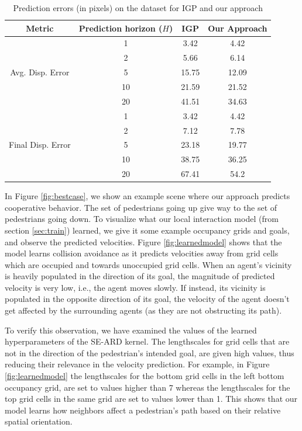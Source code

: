 \begin{table}[t!]
  \caption{Prediction errors (in pixels) on the dataset for IGP and our approach}
  \centering
  \begin{tabular}{|c|c|c|c|}
    \hline
    Metric & Prediction horizon ($H$) & IGP & Our Approach \\
    \hline
    \multirow{5}{*}{Avg. Disp. Error} & 1 & 3.42 & 4.42 \\
    & 2 & 5.66 & 6.14 \\
    & 5 & 15.75 & 12.09 \\
    & 10 & 21.59 & 21.52 \\
    & 20 & 41.51 & 34.63 \\
    \hline
    \multirow{5}{*}{Final Disp. Error} & 1 & 3.42 & 4.42 \\
    & 2 & 7.12 & 7.78 \\
    & 5 & 23.18 & 19.77 \\
    & 10 & 38.75 & 36.25 \\
    & 20 & 67.41 & 54.2 \\
    \hline
  \end{tabular}
  \label{table:results}
\end{table}

In Figure \ref{fig:bestcase}, we show an example scene where our approach predicts cooperative behavior. The set of pedestrians going up give way to the set of pedestrians going down. To visualize what our local interaction model (from section \ref{sec:train}) learned, we give it some example occupancy grids and goals, and observe the predicted velocities. Figure \ref{fig:learnedmodel} shows that the model learns collision avoidance as it predicts velocities away from grid cells which are occupied and towards unoccupied grid cells. When an agent's vicinity is heavily populated in the direction of its goal, the magnitude of predicted velocity is very low, i.e., the agent moves slowly. If instead, its vicinity is populated in the opposite direction of its goal, the velocity of the agent doesn't get affected by the surrounding agents (as they are not obstructing its path).

To verify this observation, we have examined the values of the learned hyperparameters of the SE-ARD kernel. The lengthscales for grid cells that are not in the direction of the pedestrian's intended goal, are given high values, thus reducing their relevance in the velocity prediction. For example, in Figure \ref{fig:learnedmodel} the lengthscales for the bottom grid cells in the left bottom occupancy grid, are set to values higher than 7 whereas the lengthscales for the top grid cells in the same grid are set to values lower than 1. This shows that our model learns how neighbors affect a pedestrian's path based on their relative spatial orientation. 

